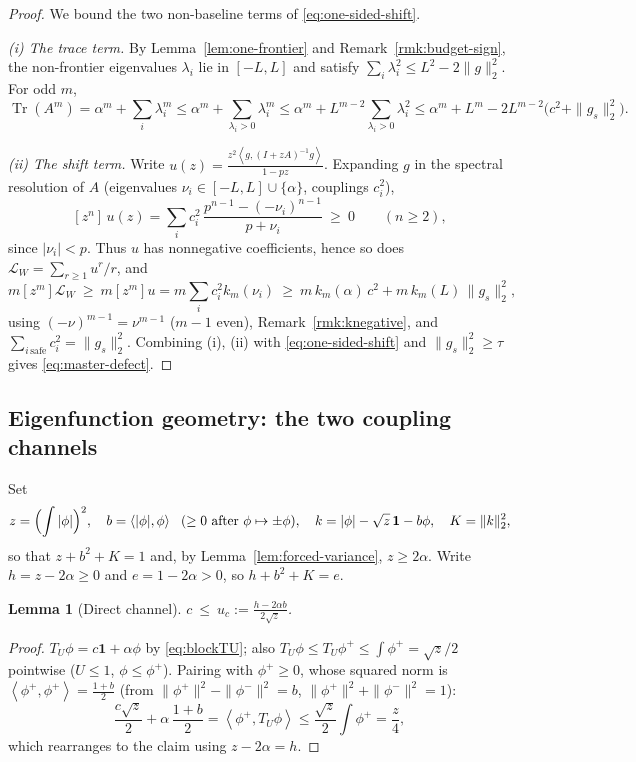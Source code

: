 \documentclass[11pt]{article}
\newtheorem{lemma}[theorem]{Lemma}
\newcommand{\one}{\mathbf 1}
\newcommand{\ip}[2]{\left\langle #1,#2\right\rangle}
\newcommand{\Tr}{\operatorname{Tr}}
\newcommand{\cL}{\mathcal L}
\begin{document}
\begin{proof}
We bound the two non-baseline terms of \eqref{eq:one-sided-shift}.

\emph{(i) The trace term.}  By Lemma~\ref{lem:one-frontier} and
Remark~\ref{rmk:budget-sign}, the non-frontier eigenvalues $\lambda_i$ lie in
$[-L,L]$ and satisfy $\sum_i\lambda_i^2\le L^2-2\|g\|_2^2$.  For odd $m$,
\[
        \Tr(A^m)=\alpha^m+\sum_i\lambda_i^m
        \le\alpha^m+\sum_{\lambda_i>0}\lambda_i^m
        \le\alpha^m+L^{m-2}\!\!\sum_{\lambda_i>0}\!\lambda_i^2
        \le\alpha^m+L^m-2L^{m-2}\bigl(c^2+\|g_s\|_2^2\bigr).
\]

\emph{(ii) The shift term.}  Write
$u(z)=\frac{z^2\ip{g}{(I+zA)^{-1}g}}{1-pz}$.  Expanding $g$ in the spectral
resolution of $A$ (eigenvalues $\nu_i\in[-L,L]\cup\{\alpha\}$, couplings
$c_i^2$),
\[
        [z^n]\,u(z)=\sum_i c_i^2\,
        \frac{p^{n-1}-(-\nu_i)^{n-1}}{p+\nu_i}\ \ge\ 0
        \qquad(n\ge2),
\]
since $|\nu_i|<p$.  Thus $u$ has nonnegative coefficients, hence so does
$\cL_W=\sum_{r\ge1}u^r/r$, and
\[
        m[z^m]\cL_W\ \ge\ m[z^m]u
        =m\sum_ic_i^2k_m(\nu_i)
        \ \ge\ m\,k_m(\alpha)\,c^2+m\,k_m(L)\,\|g_s\|_2^2,
\]
using $(-\nu)^{m-1}=\nu^{m-1}$ ($m-1$ even), Remark~\ref{rmk:knegative}, and
$\sum_{i\,\mathrm{safe}}c_i^2=\|g_s\|_2^2$.  Combining (i), (ii) with
\eqref{eq:one-sided-shift} and $\|g_s\|_2^2\ge\tau$ gives
\eqref{eq:master-defect}.
\end{proof}

\subsection{Eigenfunction geometry: the two coupling channels}

Set
\begin{equation}\label{eq:shape-defs}
        z=\Bigl(\int|\phi|\Bigr)^2,\quad
        b=\ip{|\phi|}{\phi}\ \ (\ge0\ \text{after}\ \phi\mapsto\pm\phi),\quad
        k=|\phi|-\sqrt z\,\one-b\phi,\quad K=\|k\|_2^2 ,
\end{equation}
so that $z+b^2+K=1$ and, by Lemma~\ref{lem:forced-variance}, $z\ge2\alpha$.
Write $h=z-2\alpha\ge0$ and $e=1-2\alpha>0$, so $h+b^2+K=e$.

\begin{lemma}[Direct channel]\label{lem:direct}
$\displaystyle c\ \le\ u_c:=\frac{h-2\alpha b}{2\sqrt z}$.
\end{lemma}

\begin{proof}
$T_U\phi=c\one+\alpha\phi$ by \eqref{eq:blockTU}; also
$T_U\phi\le T_U\phi^+\le\int\phi^+=\sqrt z/2$ pointwise ($U\le1$,
$\phi\le\phi^+$).  Pairing with $\phi^+\ge0$, whose squared norm is
$\ip{\phi^+}{\phi^+}=\tfrac{1+b}2$ (from
$\|\phi^+\|^2-\|\phi^-\|^2=b$, $\|\phi^+\|^2+\|\phi^-\|^2=1$):
\[
        \frac{c\sqrt z}{2}+\alpha\,\frac{1+b}{2}
        =\ip{\phi^+}{T_U\phi}
        \le\frac{\sqrt z}{2}\int\phi^+=\frac z4 ,
\]
which rearranges to the claim using $z-2\alpha=h$.
\end{proof}
\end{document}
